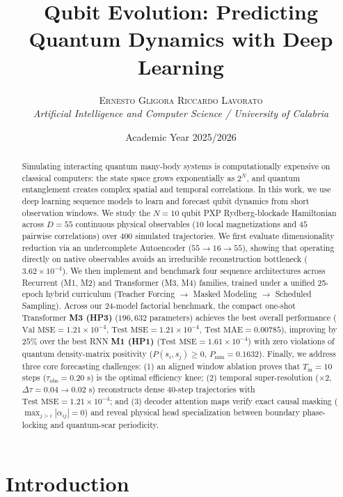 \documentclass[10pt,a4paper]{article}
\title{\Large \textbf{Qubit Evolution: Predicting Quantum Dynamics with Deep Learning}\vspace{-0.25cm}}
\author{
    \textsc{Ernesto Gligora} \qquad \textsc{Riccardo Lavorato} \\[2pt]
    \small \textit{Artificial Intelligence and Computer Science / University of Calabria}
}
\date{\vspace{-0.35cm}\small Academic Year 2025/2026\vspace{-0.25cm}}
\begin{document}
\maketitle

\begin{abstract}
\noindent
Simulating interacting quantum many-body systems is computationally expensive on classical computers: the state space grows exponentially as $2^N$, and quantum entanglement creates complex spatial and temporal correlations. In this work, we use deep learning sequence models to learn and forecast qubit dynamics from short observation windows. We study the $N = 10$ qubit PXP Rydberg-blockade Hamiltonian across $D = 55$ continuous physical observables ($10$ local magnetizations and $45$ pairwise correlations) over $400$ simulated trajectories. We first evaluate dimensionality reduction via an undercomplete Autoencoder ($55 \to 16 \to 55$), showing that operating directly on native observables avoids an irreducible reconstruction bottleneck ($3.62 \times 10^{-4}$). We then implement and benchmark four sequence architectures across Recurrent (M1, M2) and Transformer (M3, M4) families, trained under a unified 25-epoch hybrid curriculum (Teacher Forcing $\to$ Masked Modeling $\to$ Scheduled Sampling). Across our 24-model factorial benchmark, the compact one-shot Transformer \textbf{M3 (HP3)} ($196{,}632$ parameters) achieves the best overall performance ($\text{Val MSE} = 1.21 \times 10^{-4}$, $\text{Test MSE} = 1.21 \times 10^{-4}$, $\text{Test MAE} = 0.00785$), improving by $25\%$ over the best RNN \textbf{M1 (HP1)} ($\text{Test MSE} = 1.61 \times 10^{-4}$) with zero violations of quantum density-matrix positivity ($P(s_i, s_j) \ge 0$, $P_{\min} = 0.1632$). Finally, we address three core forecasting challenges: (1) an aligned window ablation proves that $T_{\text{in}} = 10$ steps ($\tau_{\text{obs}} = 0.20\text{ s}$) is the optimal efficiency knee; (2) temporal super-resolution ($\times 2$, $\Delta \tau = 0.04 \to 0.02\text{ s}$) reconstructs dense 40-step trajectories with $\text{Test MSE} = 1.21 \times 10^{-4}$; and (3) decoder attention maps verify exact causal masking ($\max_{j>i}|\alpha_{ij}| = 0$) and reveal physical head specialization between boundary phase-locking and quantum-scar periodicity.
\end{abstract}

\section{Introduction}
\end{document}
